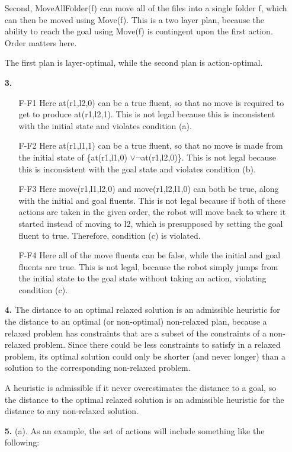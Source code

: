 \documentclass{article}
\begin{document}
\begin{enumerate}
Second, MoveAllFolder(f) can move all of the files into a single folder f,
which can then be moved using Move(f). This is a two layer plan, because the
ability to reach the goal using Move(f) is contingent upon the first action.
Order matters here.

The first plan is layer-optimal, while the second plan is action-optimal.

\item[\textbf{3.}]
\begin{enumerate}
\item[F-F1]
Here at(r1,l2,0) can be a true fluent, so that no move is required to get
to produce at(r1,l2,1). This is not legal because this is inconsistent
with the initial state and violates condition (a).
\item[F-F2]
Here at(r1,l1,1) can be a true fluent, so that no move is made from the initial
state of \{at(r1,l1,0) $\vee \neg$at(r1,l2,0)\}. This is not legal because this
is inconsistent with the goal state and violates condition (b).
\item[F-F3]
Here move(r1,l1,l2,0) and move(r1,l2,l1,0) can both be true, along with the
initial and goal fluents. This is not legal because if both of these actions
are taken in the given order, the robot will move back to where it started
instead of moving to l2, which is presupposed by setting the goal fluent to
true. Therefore, condition (c) is violated.
\item[F-F4]
Here all of the move fluents can be false, while the initial and goal fluents
are true. This is not legal, because the robot simply jumps from the initial
state to the goal state without taking an action, violating condition (c).
\end{enumerate}

\item[\textbf{4.}]
The distance to an optimal relaxed solution is an admissible heuristic for the
distance to an optimal (or non-optimal) non-relaxed plan, because a relaxed
problem has constraints that are a subset of the constraints of a non-relaxed
problem. Since there could be less constraints to satisfy in a relaxed problem,
its optimal solution could only be shorter (and never longer) than a solution
to the corresponding non-relaxed problem.

A heuristic is admissible if it never overestimates the distance to a goal,
so the distance to the optimal relaxed solution is an admissible heuristic for
the distance to any non-relaxed solution.

\item[\textbf{5.}]
(a). As an example, the set of actions will include something like the
following:


\end{enumerate}
\end{document}

